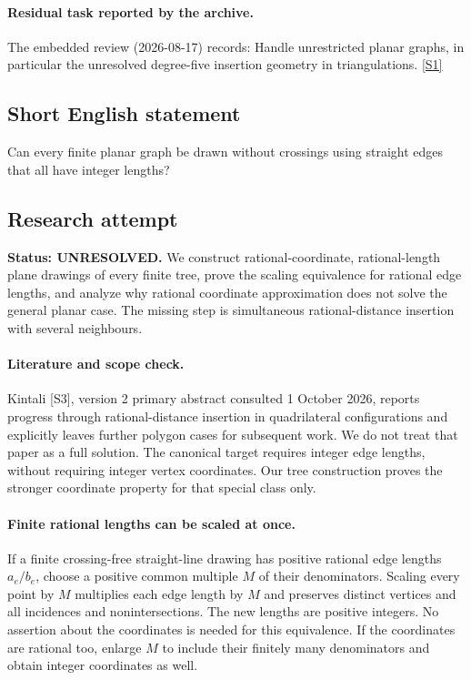 \documentclass[11pt,a4paper]{article}
\newcommand{\sref}[2]{\hyperlink{source:#1:#2}{[S#2]}}
\begin{document}
\paragraph{Residual task reported by the archive.}

The embedded review (2026-08-17) records: Handle unrestricted planar graphs, in particular the unresolved degree-five insertion geometry in triangulations. \sref{1405}{1}

\subsection{Short English statement}

Can every finite planar graph be drawn without crossings using straight edges that all have integer lengths?

\subsection{Research attempt}
\textbf{Status: UNRESOLVED.} We construct rational-coordinate, rational-length plane drawings of every finite tree, prove the scaling equivalence for rational edge lengths, and analyze why rational coordinate approximation does not solve the general planar case. The missing step is simultaneous rational-distance insertion with several neighbours.

\paragraph{Literature and scope check.}
Kintali [S3], version 2 primary abstract consulted 1 October 2026, reports progress through rational-distance insertion in quadrilateral configurations and explicitly leaves further polygon cases for subsequent work. We do not treat that paper as a full solution. The canonical target requires integer edge lengths, without requiring integer vertex coordinates. Our tree construction proves the stronger coordinate property for that special class only.

\paragraph{Finite rational lengths can be scaled at once.}
If a finite crossing-free straight-line drawing has positive rational edge lengths $a_e/b_e$, choose a positive common multiple $M$ of their denominators. Scaling every point by $M$ multiplies each edge length by $M$ and preserves distinct vertices and all incidences and nonintersections. The new lengths are positive integers. No assertion about the coordinates is needed for this equivalence. If the coordinates are rational too, enlarge $M$ to include their finitely many denominators and obtain integer coordinates as well.
\end{document}
